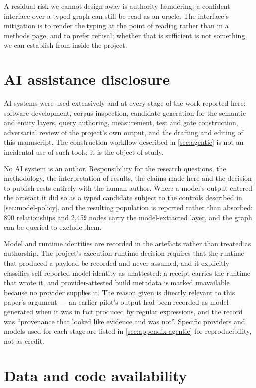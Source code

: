 A residual risk we cannot design away is authority laundering: a confident interface
over a typed graph can still be read as an oracle. The interface's mitigation is to
render the typing at the point of reading rather than in a methods page, and to
prefer refusal; whether that is sufficient is not something we can establish from
inside the project.

\section*{AI assistance disclosure}

AI systems were used extensively and at every stage of the work reported here:
software development, corpus inspection, candidate generation for the semantic and
entity layers, query authoring, measurement, test and gate construction, adversarial
review of the project's own output, and the drafting and editing of this manuscript.
The construction workflow described in \cref{sec:agentic} is not an incidental use of
such tools; it is the object of study.

No AI system is an author. Responsibility for the research questions, the
methodology, the interpretation of results, the claims made here and the decision to
publish rests entirely with the human author. Where a model's output entered the
artefact it did so as a typed candidate subject to the controls described in
\cref{sec:model-policy}, and the resulting population is reported rather than
absorbed: 890 relationships and 2{,}459 nodes carry the model-extracted layer, and
the graph can be queried to exclude them.

Model and runtime identities are recorded in the artefacts rather than treated as
authorship. The project's execution-runtime decision requires that the runtime that
produced a payload be recorded and never assumed, and it explicitly classifies
self-reported model identity as unattested: a receipt carries the runtime that wrote
it, and provider-attested build metadata is marked unavailable because no provider
supplies it. The reason given is directly relevant to this paper's argument --- an
earlier pilot's output had been recorded as model-generated when it was in fact
produced by regular expressions, and the record was ``provenance that looked like
evidence and was not''. Specific providers and models used for each stage are listed
in \cref{sec:appendix-agentic} for reproducibility, not as credit.

\section*{Data and code availability}
\label{sec:data-availability}

